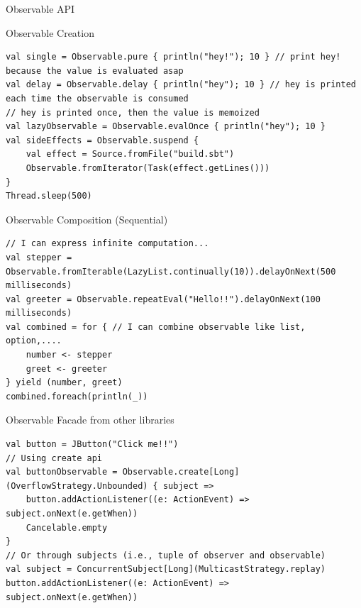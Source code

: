 \documentclass[presentation, 9pt]{beamer}\mode<presentation>{\usetheme{AMSBolognaFC}}
\begin{document}
\begin{frame}{Observable API}
	\begin{alertblock}{Observable Creation}
		\begin{tcolorbox}[left=0pt, top=0pt, bottom=0pt]
					 \begin{verbatim}
val single = Observable.pure { println("hey!"); 10 } // print hey! because the value is evaluated asap
val delay = Observable.delay { println("hey"); 10 } // hey is printed each time the observable is consumed
// hey is printed once, then the value is memoized
val lazyObservable = Observable.evalOnce { println("hey"); 10 } 
val sideEffects = Observable.suspend {
	val effect = Source.fromFile("build.sbt")
	Observable.fromIterator(Task(effect.getLines()))
}
Thread.sleep(500)
					 \end{verbatim}
				 \end{tcolorbox}
		 \end{alertblock}	

		 \begin{alertblock}{Observable Composition (Sequential)}
			\begin{tcolorbox}[left=0pt, top=0pt, bottom=0pt]
						 \begin{verbatim}
// I can express infinite computation...
val stepper = Observable.fromIterable(LazyList.continually(10)).delayOnNext(500 milliseconds)
val greeter = Observable.repeatEval("Hello!!").delayOnNext(100 milliseconds)
val combined = for { // I can combine observable like list, option,....
	number <- stepper
	greet <- greeter
} yield (number, greet)
combined.foreach(println(_))
						 \end{verbatim}
					 \end{tcolorbox}
			 \end{alertblock}	

			 \begin{alertblock}{Observable Facade from other libraries}
				\begin{tcolorbox}[left=0pt, top=0pt, bottom=0pt]
							 \begin{verbatim}
val button = JButton("Click me!!")
// Using create api
val buttonObservable = Observable.create[Long](OverflowStrategy.Unbounded) { subject =>
	button.addActionListener((e: ActionEvent) => subject.onNext(e.getWhen))
	Cancelable.empty
}
// Or through subjects (i.e., tuple of observer and observable)
val subject = ConcurrentSubject[Long](MulticastStrategy.replay)
button.addActionListener((e: ActionEvent) => subject.onNext(e.getWhen))
							 \end{verbatim}
						 \end{tcolorbox}
				 \end{alertblock}	


\end{frame}
\end{document}
